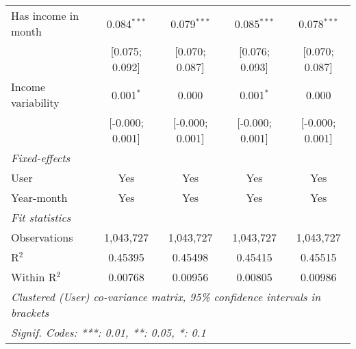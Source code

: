 \begin{table}[htbp]
\begin{threeparttable}[b]
\begin{tabular}{lcccc}
         Has income in month       & 0.084$^{***}$   & 0.079$^{***}$   & 0.085$^{***}$    & 0.078$^{***}$\\   
                                   & [0.075; 0.092]  & [0.070; 0.087]  & [0.076; 0.093]   & [0.070; 0.087]\\   
         Income variability        & 0.001$^{*}$     & 0.000           & 0.001$^{*}$      & 0.000\\   
                                   & [-0.000; 0.001] & [-0.000; 0.001] & [-0.000; 0.001]  & [-0.000; 0.001]\\   
         \midrule
         \emph{Fixed-effects}\\
         User                      & Yes             & Yes             & Yes              & Yes\\  
         Year-month                & Yes             & Yes             & Yes              & Yes\\  
         \midrule
         \emph{Fit statistics}\\
         Observations              & 1,043,727       & 1,043,727       & 1,043,727        & 1,043,727\\  
         R$^2$                     & 0.45395         & 0.45498         & 0.45415          & 0.45515\\  
         Within R$^2$              & 0.00768         & 0.00956         & 0.00805          & 0.00986\\  
         \midrule \midrule
         \multicolumn{5}{l}{\emph{Clustered (User) co-variance matrix, 95\% confidence intervals in brackets}}\\
         \multicolumn{5}{l}{\emph{Signif. Codes: ***: 0.01, **: 0.05, *: 0.1}}\\
      \end{tabular}
   \end{threeparttable}
\end{table}


